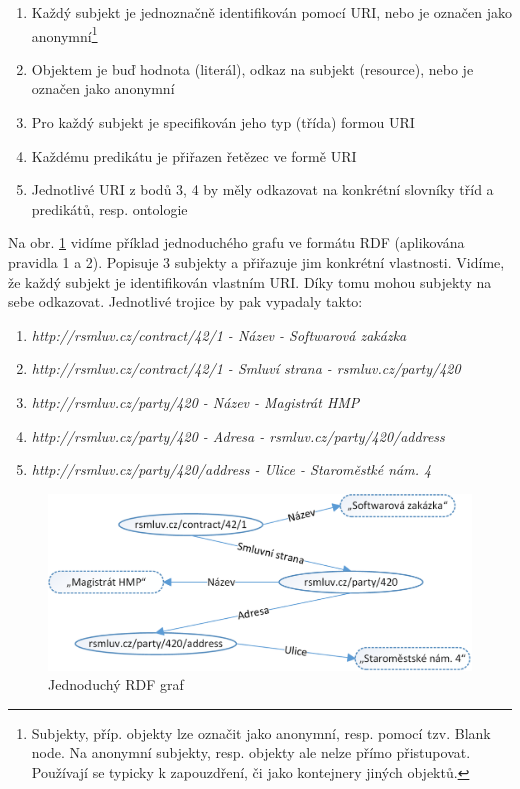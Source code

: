 \begin{enumerate}
\item Každý subjekt je jednoznačně identifikován pomocí URI, nebo je označen jako anonymní\footnote{Subjekty, příp. objekty lze označit jako anonymní, resp. pomocí tzv. Blank node. Na anonymní subjekty, resp. objekty ale nelze přímo přistupovat. Používají se typicky k zapouzdření, či jako kontejnery jiných objektů.} 
\item Objektem je buď hodnota (literál), odkaz na subjekt (resource), nebo je označen jako anonymní
\item Pro každý subjekt je specifikován jeho typ (třída) formou URI
\item Každému predikátu je přiřazen řetězec ve formě URI
\item Jednotlivé URI z bodů 3, 4 by měly odkazovat na konkrétní slovníky tříd a predikátů, resp. ontologie
\end{enumerate}

Na obr. \ref{obr:rdf_graph} vidíme příklad jednoduchého grafu ve formátu RDF (aplikována pravidla 1 a 2). Popisuje 3 subjekty a přiřazuje jim konkrétní vlastnosti. Vidíme, že každý subjekt je identifikován vlastním URI. Díky tomu mohou subjekty na sebe odkazovat. Jednotlivé trojice by pak vypadaly takto:

\begin{enumerate}
\item \textit{http://rsmluv.cz/contract/42/1 - Název - Softwarová zakázka}   
\item \textit{http://rsmluv.cz/contract/42/1 - Smluví strana - rsmluv.cz/party/420}
\item \textit{http://rsmluv.cz/party/420 - Název - Magistrát HMP}
\item \textit{http://rsmluv.cz/party/420 - Adresa - rsmluv.cz/party/420/address}
\item \textit{http://rsmluv.cz/party/420/address - Ulice - Staroměstké nám. 4}
\end{enumerate}

\begin{figure}[h]
\centerline{\includegraphics[width=\textwidth]{img/rdf_graph.eps}}
\caption{Jednoduchý RDF graf}
\label{obr:rdf_graph}
\end{figure}


